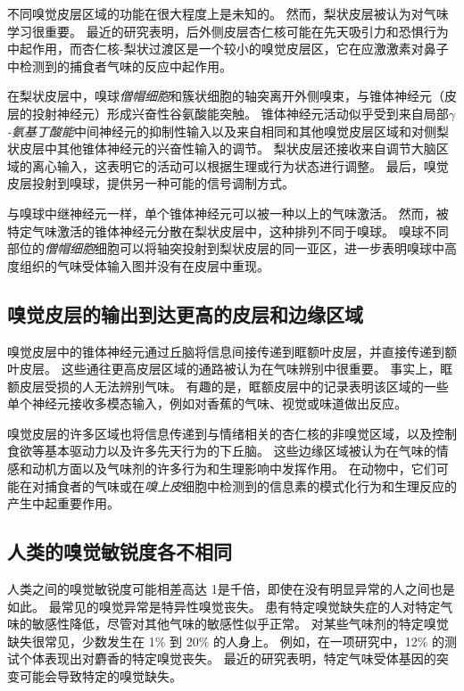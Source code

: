 不同嗅觉皮层区域的功能在很大程度上是未知的。
然而，梨状皮层被认为对气味学习很重要。
最近的研究表明，后外侧皮层杏仁核可能在先天吸引力和恐惧行为中起作用，而杏仁核-梨状过渡区是一个较小的嗅觉皮层区，它在应激激素对鼻子中检测到的捕食者气味的反应中起作用。


在梨状皮层中，嗅球\textit{僧帽细胞}和簇状细胞的轴突离开外侧嗅束，与锥体神经元（皮层的投射神经元）形成兴奋性谷氨酸能突触。
锥体神经元活动似乎受到来自局部\textit{$\gamma$-氨基丁酸能}中间神经元的抑制性输入以及来自相同和其他嗅觉皮层区域和对侧梨状皮层中其他锥体神经元的兴奋性输入的调节。
梨状皮层还接收来自调节大脑区域的离心输入，这表明它的活动可以根据生理或行为状态进行调整。
最后，嗅觉皮层投射到嗅球，提供另一种可能的信号调制方式。


与嗅球中继神经元一样，单个锥体神经元可以被一种以上的气味激活。
然而，被特定气味激活的锥体神经元分散在梨状皮层中，这种排列不同于嗅球。
嗅球不同部位的\textit{僧帽细胞}细胞可以将轴突投射到梨状皮层的同一亚区，进一步表明嗅球中高度组织的气味受体输入图并没有在皮层中重现。



\subsection{嗅觉皮层的输出到达更高的皮层和边缘区域}

嗅觉皮层中的锥体神经元通过丘脑将信息间接传递到眶额叶皮层，并直接传递到额叶皮层。
这些通往更高皮层区域的通路被认为在气味辨别中很重要。
事实上，眶额皮层受损的人无法辨别气味。
有趣的是，眶额皮层中的记录表明该区域的一些单个神经元接收多模态输入，例如对香蕉的气味、视觉或味道做出反应。


嗅觉皮层的许多区域也将信息传递到与情绪相关的杏仁核的非嗅觉区域，以及控制食欲等基本驱动力以及许多先天行为的下丘脑。
这些边缘区域被认为在气味的情感和动机方面以及气味剂的许多行为和生理影响中发挥作用。
在动物中，它们可能在对捕食者的气味或在\textit{嗅上皮}细胞中检测到的信息素的模式化行为和生理反应的产生中起重要作用。



\subsection{人类的嗅觉敏锐度各不相同}

人类之间的嗅觉敏锐度可能相差高达 1是千倍，即使在没有明显异常的人之间也是如此。
最常见的嗅觉异常是特异性嗅觉丧失。
患有特定嗅觉缺失症的人对特定气味的敏感性降低，尽管对其他气味的敏感性似乎正常。
对某些气味剂的特定嗅觉缺失很常见，少数发生在 1\% 到 20\% 的人身上。
例如，在一项研究中，12\% 的测试个体表现出对麝香的特定嗅觉丧失。
最近的研究表明，特定气味受体基因的突变可能会导致特定的嗅觉缺失。


